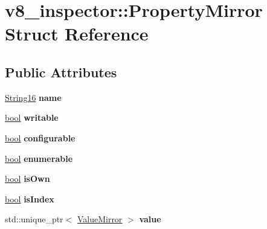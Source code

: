 \hypertarget{structv8__inspector_1_1PropertyMirror}{}\section{v8\+\_\+inspector\+:\+:Property\+Mirror Struct Reference}
\label{structv8__inspector_1_1PropertyMirror}
\subsection*{Public Attributes}
\begin{DoxyCompactItemize}
\item 
\mbox{\label{structv8__inspector_1_1PropertyMirror_a83d8908cbf107021961f246e6914487e}} 
\mbox{\hyperlink{classv8__inspector_1_1String16}{String16}} {\bfseries name}
\item 
\mbox{\label{structv8__inspector_1_1PropertyMirror_a154295757088341abd2252f8fcf1c03e}} 
\mbox{\hyperlink{classbool}{bool}} {\bfseries writable}
\item 
\mbox{\label{structv8__inspector_1_1PropertyMirror_a2f2e2432749d158aaab8de30539d3dbd}} 
\mbox{\hyperlink{classbool}{bool}} {\bfseries configurable}
\item 
\mbox{\label{structv8__inspector_1_1PropertyMirror_a035853b7de346931558ad4f378ef1ec9}} 
\mbox{\hyperlink{classbool}{bool}} {\bfseries enumerable}
\item 
\mbox{\label{structv8__inspector_1_1PropertyMirror_a4a04cdca151aeea624944acbd6f75b56}} 
\mbox{\hyperlink{classbool}{bool}} {\bfseries is\+Own}
\item 
\mbox{\label{structv8__inspector_1_1PropertyMirror_a69386cc63e05b91c568ec52520321721}} 
\mbox{\hyperlink{classbool}{bool}} {\bfseries is\+Index}
\item 
\mbox{\label{structv8__inspector_1_1PropertyMirror_a473deaf260b04df81bdb72b9bee4fd68}} 
std\+::unique\+\_\+ptr$<$ \mbox{\hyperlink{classv8__inspector_1_1ValueMirror}{Value\+Mirror}} $>$ {\bfseries value}

\end{DoxyCompactItemize}
